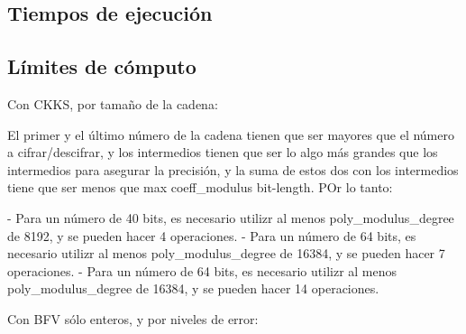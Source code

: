 \subsection{Tiempos de ejecución}

\subsection{Límites de cómputo}

Con CKKS, por tamaño de la cadena:

El primer y el último número de la cadena tienen que ser mayores que el número a cifrar/descifrar, y los intermedios tienen que ser lo algo más grandes  que los intermedios para asegurar la precisión, y la suma de estos dos con los intermedios tiene que ser menos que max coeff_modulus bit-length. POr lo tanto:

- Para un número de 40 bits, es necesario utilizr al menos poly_modulus_degree de 8192, y se pueden hacer 4 operaciones.
- Para un número de 64 bits, es necesario utilizr al menos poly_modulus_degree de 16384, y se pueden hacer 7 operaciones.
- Para un número de 64 bits, es necesario utilizr al menos poly_modulus_degree de 16384, y se pueden hacer 14 operaciones.



Con BFV sólo enteros, y por niveles de error:
